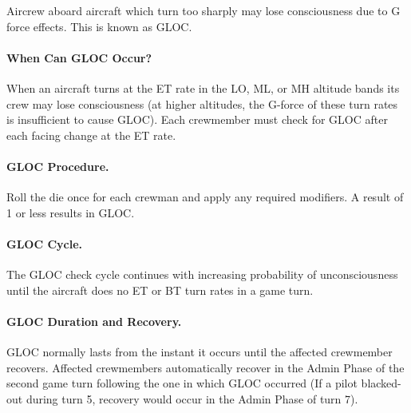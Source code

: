 \begin{advancedrules}
Aircrew aboard aircraft which turn too sharply may lose consciousness due to G force effects. This is known as GLOC.

\paragraph{When Can GLOC Occur?} 
When an aircraft turns at the ET rate in the LO, ML, or MH altitude bands its crew may lose consciousness (at higher altitudes, the G-force of these turn rates is insufficient to cause GLOC). Each crewmember must check for GLOC after each facing change at the ET rate.


\paragraph{GLOC Procedure.} 
Roll the die once for each crewman and apply any required modifiers. A result of 1 or less results in GLOC. 

\paragraph{GLOC Cycle.} The GLOC check cycle continues with increasing probability of unconsciousness until the aircraft does no ET or BT turn rates in a game turn.

\paragraph{GLOC Duration and Recovery.} 
 GLOC normally lasts from the instant it occurs until the affected crewmember recovers. Affected crewmembers automatically recover in the Admin Phase of the second game turn following the one in which GLOC occurred (If a pilot blacked-out during turn 5, recovery would occur in the Admin Phase of turn 7).


\end{advancedrules}
